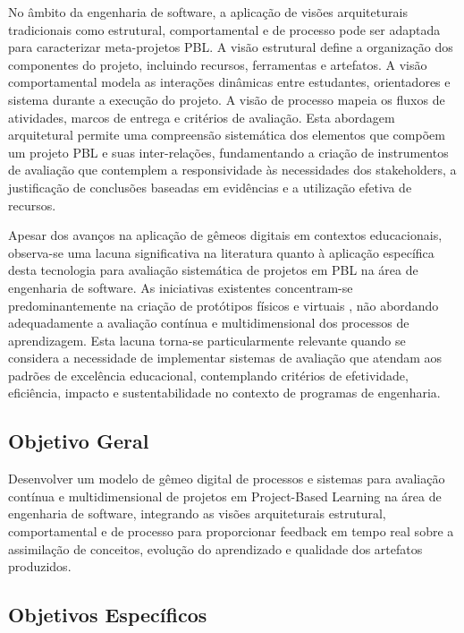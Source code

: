 \documentclass[12pt, a4paper, oneside]{abntex2}
\begin{document}
No âmbito da engenharia de software, a aplicação de visões arquiteturais tradicionais como estrutural, comportamental e de processo pode ser adaptada para caracterizar meta-projetos PBL. A visão estrutural define a organização dos componentes do projeto, incluindo recursos, ferramentas e artefatos. A visão comportamental modela as interações dinâmicas entre estudantes, orientadores e sistema durante a execução do projeto. A visão de processo mapeia os fluxos de atividades, marcos de entrega e critérios de avaliação. Esta abordagem arquitetural permite uma compreensão sistemática dos elementos que compõem um projeto PBL e suas inter-relações, fundamentando a criação de instrumentos de avaliação que contemplem a responsividade às necessidades dos stakeholders, a justificação de conclusões baseadas em evidências e a utilização efetiva de recursos.

Apesar dos avanços na aplicação de gêmeos digitais em contextos educacionais, observa-se uma lacuna significativa na literatura quanto à aplicação específica desta tecnologia para avaliação sistemática de projetos em PBL na área de engenharia de software. As iniciativas existentes concentram-se predominantemente na criação de protótipos físicos e virtuais \cite{bachmann2023}, não abordando adequadamente a avaliação contínua e multidimensional dos processos de aprendizagem. Esta lacuna torna-se particularmente relevante quando se considera a necessidade de implementar sistemas de avaliação que atendam aos padrões de excelência educacional, contemplando critérios de efetividade, eficiência, impacto e sustentabilidade no contexto de programas de engenharia.

\subsection{Objetivo Geral}

Desenvolver um modelo de gêmeo digital de processos e sistemas para avaliação contínua e multidimensional de projetos em Project-Based Learning na área de engenharia de software, integrando as visões arquiteturais estrutural, comportamental e de processo para proporcionar feedback em tempo real sobre a assimilação de conceitos, evolução do aprendizado e qualidade dos artefatos produzidos.

\subsection{Objetivos Específicos}
\end{document}
